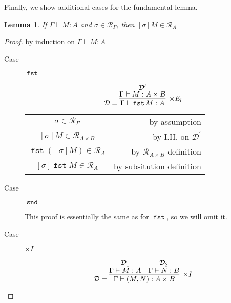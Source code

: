 \documentclass[letterpaper,11pt]{article}
\newtheorem{lemma}{Lemma}
\newcommand{\R}{\mathcal{R}}
\newcommand{\proves}{\vdash}
\DeclareMathOperator{\fst}{\mathtt{fst}}
\DeclareMathOperator{\snd}{\mathtt{snd}}
\begin{document}
Finally, we show additional cases for the fundamental lemma.

\begin{lemma}
    If $\Gamma \proves M : A$ and $\sigma \in \R_\Gamma$,
    then $[\sigma]M \in \R_A$
\end{lemma}

\begin{proof} by induction on $\Gamma \proves M : A$

    \begin{description}
        \item[Case] $\fst{}$

            \begin{equation*}
                \mathcal{D} = \infer[\times E_l]{\Gamma \proves \fst M : A}{
                    \deduce[\mathcal{D}^\prime]{\Gamma \proves M : A \times B}{}
                }
            \end{equation*}

            \begin{center}
                \begin{tabular}{c r}
                    $\sigma \in \R_\Gamma$ &
                    by assumption \\
                    $[\sigma]M \in \R_{A \times B}$ &
                    by I.H. on $\mathcal{D}^\prime$ \\
                    $\fst{([\sigma]M)} \in \R_A$ &
                    by $\R_{A \times B}$ definition \\
                    $[\sigma]\fst M \in \R_A$ &
                    by subsitution definition
                \end{tabular}
            \end{center}

        \item[Case] $\snd{}$

            This proof is essentially the same as for $\fst{}$, so we will omit
            it.

        \item[Case] $\times I$

            \begin{equation*}
                \mathcal{D} =
                \infer[\times I]{\Gamma \proves (M, N) : A \times B}{
                    \deduce[\mathcal{D}_1]{\Gamma \proves M : A}{}
                    &
                    \deduce[\mathcal{D}_2]{\Gamma \proves N : B}{}
                }
            \end{equation*}


\end{description}
\end{proof}
\end{document}
